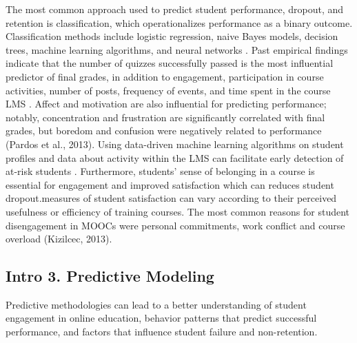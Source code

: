 \documentclass[sigconf]{acmart}
\begin{document}
The most common approach used to predict student performance, dropout, and 
retention is classification, which operationalizes performance as a binary 
outcome. Classification methods include logistic regression, naive Bayes 
models, decision trees, machine learning algorithms, and neural networks 
\cite{Lykourentzou09}. Past empirical findings indicate that the number of 
quizzes successfully passed is the most influential predictor of final grades, 
in addition to engagement, participation in course activities, number of posts, 
frequency of events, and time spent in the course LMS 
\cite{Papamitsiou14, romerozaldivar12}. Affect and motivation are also 
influential for predicting performance; notably, concentration and 
frustration are significantly correlated with final grades, but boredom and 
confusion were negatively related to performance (Pardos et al., 2013). 
Using data-driven machine learning algorithms on student profiles and data 
about activity within the LMS can facilitate early detection of at-risk 
students \cite{Dekkar09}. Furthermore, students’ sense of belonging in a 
course is essential for engagement and improved satisfaction which can 
reduces student dropout.measures of student satisfaction can vary according 
to their perceived usefulness or efficiency of training courses. The most 
common reasons for  student disengagement in MOOCs were personal commitments, 
work conflict and course overload (Kizilcec, 2013). 


\subsection{Intro 3. Predictive Modeling}


Predictive methodologies can lead to a better 
understanding of student engagement in online education, behavior patterns 
that predict successful performance, and factors that influence student failure 
and non-retention. 
\end{document}

